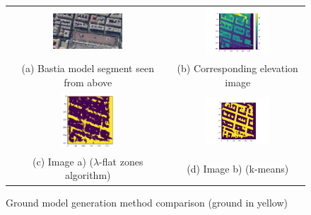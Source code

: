 \documentclass{kththesis}
\begin{document}
\begin{figure}[H]
	\begin{tabular}{c c}
		\includegraphics[width=0.45\textwidth]{images/Results/MRF_survey/bastia_view.png}
		&  \includegraphics[width=0.5\textwidth]{images/Results/minimal_z_1msquare.png} \\ 
		(a) Bastia model segment seen from above 
		& (b) Corresponding elevation image \\
		
		\includegraphics[width=0.35\textwidth]{images/Results/ground_model_lambda_inverted.png}
		&  \includegraphics[width=0.5\textwidth]{images/Results/binary_ground.png}\\ 
		(c) Image a) ($\lambda$-flat zones algorithm)
		& (d) Image b) (k-means)  \\
	\end{tabular}
    \caption{Ground model generation method comparison (ground in yellow)}
    \label{fig:gmg}
\end{figure} 
\end{document}
